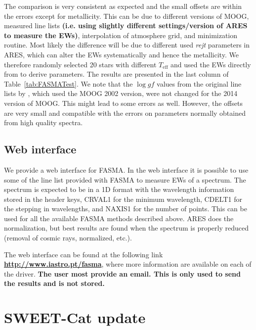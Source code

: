 \documentclass{aa}
\begin{document}
The comparison is very consistent as expected and the small offsets are within
the errors except for metallicity. This can be due to different versions of
MOOG, measured line lists {\bf (i.e. using slightly different settings/version
of ARES to measure the EWs)}, interpolation of atmosphere grid, and minimization
routine. Most likely the difference will be due to different used \emph{rejt}
parameters in ARES, which can alter the EWs systematically and hence the
metallicity. We therefore randomly selected 20 stars with different
$T_\mathrm{eff}$ and used the EWs directly from \citet{Sousa2011} to derive
parameters. The results are presented in the last column of
Table~\ref{tab:FASMATest}. We note that the $\log gf$ values from the original
line lists by \citet{Sousa2011}, which used the MOOG 2002 version, were not
changed for the 2014 version of MOOG. This might lead to some errors as well.
However, the offsets are very small and compatible with the errors on parameters
normally obtained from high quality spectra.


\subsection{Web interface}
\label{sub:Web interface}

We provide a web interface for FASMA. In the web interface it is possible to use
some of the line list provided with FASMA to measure EWs of a spectrum. The
spectrum is expected to be in a 1D format with the wavelength information stored
in the header keys, CRVAL1 for the minimum wavelength, CDELT1 for the stepping
in wavelengths, and NAXIS1 for the number of points. This can be used for all
the available FASMA methods described above. ARES does the normalization, but
best results are found when the spectrum is properly reduced (removal of cosmic
rays, normalized, etc.).

The web interface can be found at the following link
{\bf \url{http://www.iastro.pt/fasma}}, where more information are
available on each of the driver. {\bf The user most provide an email. This is
only used to send the results and is not stored.}


\section{SWEET-Cat update}
\end{document}
